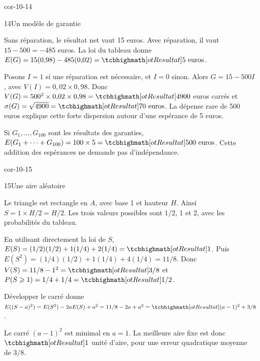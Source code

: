 \begin{blocLivre}{cor-10-14}
\begin{corrige}{14}{Un modèle de garantie}
\begin{questions}
\item Sans réparation, le résultat net vaut 15 euros.
Avec réparation, il vaut $15-500=-485$ euros.
La loi du tableau donne $E(G)=15(0{,}98)-485(0{,}02)=\res{5\text{ euros}}$.
\item Posons $I=1$ si une réparation est nécessaire, et $I=0$ sinon.
Alors $G=15-500I$, avec $V(I)=0{,}02\times0{,}98$.
Donc $V(G)=500^2\times0{,}02\times0{,}98=\res{4900}$ euros carrés et
$\sigma(G)=\sqrt{4900}=\res{70\text{ euros}}$.
La dépense rare de 500 euros explique cette forte dispersion autour d’une espérance de 5 euros.
\item Si $G_1,\ldots,G_{100}$ sont les résultats des garanties,
$E(G_1+\cdots+G_{100})=100\times5=\res{500\text{ euros}}$.
Cette addition des espérances ne demande pas d’indépendance.
\end{questions}

\label{figlivre-r10-14-loi-cor}

\end{corrige}
\end{blocLivre}
\begin{blocLivre}{cor-10-15}
\begin{corrige}{15}{Une aire aléatoire}
\begin{questions}
\item Le triangle est rectangle en $A$, avec base 1 et hauteur $H$.
Ainsi $S=1\times H/2=H/2$.
Les trois valeurs possibles sont $1/2$, 1 et 2, avec les probabilités du tableau.
\item En utilisant directement la loi de $S$,
$E(S)=(1/2)(1/2)+1(1/4)+2(1/4)=\res{1}$.
Puis $E(S^2)=(1/4)(1/2)+1(1/4)+4(1/4)=11/8$.
Donc $V(S)=11/8-1^2=\res{3/8}$ et $P(S\geq1)=1/4+1/4=\res{1/2}$.
\item Développer le carré donne
$E((S-a)^2)=E(S^2)-2aE(S)+a^2=11/8-2a+a^2=\res{(a-1)^2+3/8}$.
\item Le carré $(a-1)^2$ est minimal en $a=1$.
La meilleure aire fixe est donc $\res{1}$ unité d’aire, pour une erreur quadratique moyenne de $3/8$.
\end{questions}

\label{figlivre-r10-15-loi-cor}

\label{figlivre-r10-15-triangle-cor}

\end{corrige}
\end{blocLivre}

